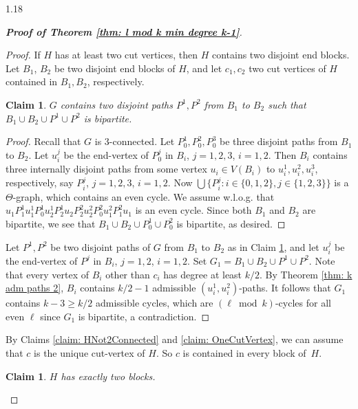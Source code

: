 \documentclass[10pt]{article}
\newtheorem{claim}{Claim}
\newtheorem{subclaim}{Claim}[claim]
\begin{document}
\begin{spacing}{1.18}
\begin{proof}[\bf Proof of Theorem \ref{thm: l mod k min degree k-1}]
\begin{proof}
    If $H$ has at least two cut vertices, then $H$ contains two disjoint end blocks. Let $B_1$, $B_2$ be two disjoint end blocks of $H$, and let $c_1,c_2$ two cut vertices of $H$ contained in $B_1,B_2$, respectively.

    \begin{subclaim}\label{claim: DisjointPathFromB1toB2}
        $G$ contains two disjoint paths $P^1,P^2$ from $B_1$ to $B_2$ such that $B_1\cup B_2\cup P^1\cup P^2$ is bipartite.
    \end{subclaim}

    \begin{proof}
        Recall that $G$ is 3-connected. Let $P_0^1,P_0^2,P_0^3$ be three disjoint paths from $B_1$ to $B_2$. Let $u_i^j$ be the end-vertex of $P_0^j$ in $B_i$, $j=1,2,3$, $i=1,2$. Then $B_i$ contains three internally disjoint paths from some vertex $u_i\in V(B_i)$ to $u_i^1, u_i^2, u_i^3$, respectively, say $P_i^j$, $j=1,2,3$, $i=1,2$. Now $\bigcup\{P_i^j: i\in\{0,1,2\}, j\in\{1,2,3\}\}$ is a $\varTheta$-graph, which contains an even cycle. We assume w.l.o.g. that $u_1P_1^1u_1^1P_0^1u_2^1P_2^1u_2P_2^2u_2^2P_0^2u_1^2P_1^2u_1$ is an even cycle. Since both $B_1$ and $B_2$ are bipartite, we see that $B_1\cup B_2\cup P_0^1\cup P_0^2$ is bipartite, as desired.
    \end{proof}

    Let $P^1,P^2$ be two disjoint paths of $G$ from $B_1$ to $B_2$ as in Claim \ref{claim: DisjointPathFromB1toB2}, and let $u_i^j$ be the end-vertex of $P^j$ in $B_i$, $j=1,2$, $i=1,2$. Set $G_1=B_1\cup B_2\cup P^1\cup P^2$. Note that every vertex of $B_i$ other than $c_i$ has degree at least $k/2$. By Theorem \ref{thm: k adm paths 2}, $B_i$ contains $k/2-1$ admissible $(u_i^1,u_i^2)$-paths. It follows that $G_1$ contains $k-3\geqslant k/2$ admissible cycles, which are $(\ell\bmod k)$-cycles for all even $\ell$ since $G_1$ is bipartite, a contradiction.
\end{proof}

By Claims \ref{claim: HNot2Connected} and \ref{claim: OneCutVertex}, we can assume that $c$ is the unique cut-vertex of $H$. So $c$ is contained in every block of~$H$.

\begin{claim}\label{claim: TwoBlocks}
    $H$ has exactly two blocks.
\end{claim}


\end{proof}
\end{spacing}
\end{document}

